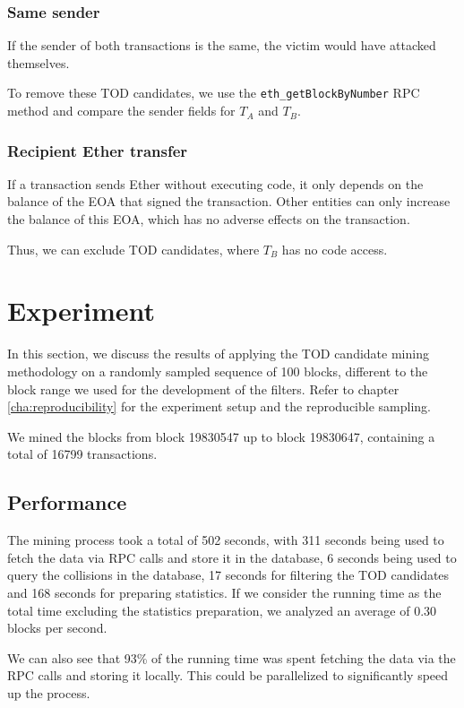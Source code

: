 \documentclass[draft,final]{vutinfth} %
\begin{document}
\subsubsection{Same sender}

If the sender of both transactions is the same, the victim would have attacked themselves.

To remove these TOD candidates, we use the \verb|eth_getBlockByNumber| RPC method and compare the sender fields for $T_A$ and $T_B$.

\subsubsection{Recipient Ether transfer}

If a transaction sends Ether without executing code, it only depends on the balance of the EOA that signed the transaction. Other entities can only increase the balance of this EOA, which has no adverse effects on the transaction.

Thus, we can exclude TOD candidates, where $T_B$ has no code access.

\section{Experiment}

In this section, we discuss the results of applying the TOD candidate mining methodology on a randomly sampled sequence of 100 blocks, different to the block range we used for the development of the filters. Refer to chapter \ref{cha:reproducibility} for the experiment setup and the reproducible sampling.

We mined the blocks from block 19830547 up to block 19830647, containing a total of 16799 transactions.

\subsection{Performance}

The mining process took a total of 502 seconds, with 311 seconds being used to fetch the data via RPC calls and store it in the database, 6 seconds being used to query the collisions in the database, 17 seconds for filtering the TOD candidates and 168 seconds for preparing statistics. If we consider the running time as the total time excluding the statistics preparation, we analyzed an average of 0.30 blocks per second.

We can also see that 93\% of the running time was spent fetching the data via the RPC calls and storing it locally. This could be parallelized to significantly speed up the process.
\end{document}
